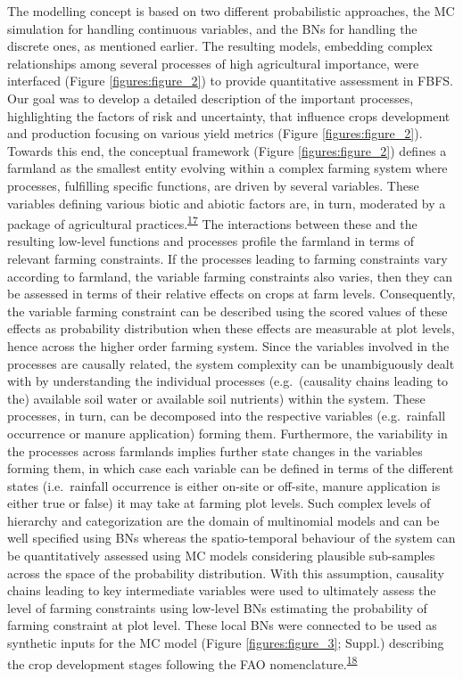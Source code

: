 \documentclass[12pt,oneside]{article}
\begin{document}
The modelling concept is based on two different probabilistic
approaches, the MC simulation for handling continuous variables, and the
BNs for handling the discrete ones, as mentioned earlier. The resulting
models, embedding complex relationships among several processes of high
agricultural importance, were interfaced (Figure \ref{figures:figure_2})
to provide quantitative assessment in FBFS. Our goal was to develop a
detailed description of the important processes, highlighting the
factors of risk and uncertainty, that influence crops development and
production focusing on various yield metrics (Figure
\ref{figures:figure_2}). Towards this end, the conceptual framework
(Figure \ref{figures:figure_2}) defines a farmland as the smallest
entity evolving within a complex farming system where processes,
fulfilling specific functions, are driven by several variables. These
variables defining various biotic and abiotic factors are, in turn,
moderated by a package of agricultural
practices.\textsuperscript{\protect\hyperlink{ref-Jax_and_Setala_2005}{17}}
The interactions between these and the resulting low-level functions and
processes profile the farmland in terms of relevant farming constraints.
If the processes leading to farming constraints vary according to
farmland, the variable farming constraints also varies, then they can be
assessed in terms of their relative effects on crops at farm levels.
Consequently, the variable farming constraint can be described using the
scored values of these effects as probability distribution when these
effects are measurable at plot levels, hence across the higher order
farming system. Since the variables involved in the processes are
causally related, the system complexity can be unambiguously dealt with
by understanding the individual processes (e.g.~(causality chains
leading to the) available soil water or available soil nutrients) within
the system. These processes, in turn, can be decomposed into the
respective variables (e.g.~rainfall occurrence or manure application)
forming them. Furthermore, the variability in the processes across
farmlands implies further state changes in the variables forming them,
in which case each variable can be defined in terms of the different
states (i.e.~rainfall occurrence is either on-site or off-site, manure
application is either true or false) it may take at farming plot levels.
Such complex levels of hierarchy and categorization are the domain of
multinomial models and can be well specified using BNs whereas the
spatio-temporal behaviour of the system can be quantitatively assessed
using MC models considering plausible sub-samples across the space of
the probability distribution. With this assumption, causality chains
leading to key intermediate variables were used to ultimately assess the
level of farming constraints using low-level BNs estimating the
probability of farming constraint at plot level. These local BNs were
connected to be used as synthetic inputs for the MC model (Figure
\ref{figures:figure_3}; Suppl.) describing the crop development stages
following the FAO
nomenclature.\textsuperscript{\protect\hyperlink{ref-Allen_et_al_1998}{18}}
\end{document}
